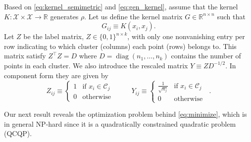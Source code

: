 \documentclass{article}
\DeclareMathOperator{\diag}{diag}
\newcommand\kk{K}
\newcommand\C{{\mathcal{C}}}
\newcommand\Zt{Y}
\begin{document}
Based on 
\eqref{eq:kernel_semimetric} and \eqref{eq:gen_kernel}, assume that 
the kernel $\kk: \mathcal{X} \times \mathcal{X} \to \mathbb{R}$ 
generates $\rho$. 
Let us define  the kernel matrix
$G \in \mathbb{R}^{n\times n}$ such that
\begin{equation}
\label{eq:kernel_matrix}
G_{ij} \equiv \kk(x_i, x_j).
\end{equation}
Let $Z$ be the label matrix, $Z \in \{ 0,1 \}^{n\times k}$, 
with only one nonvanishing entry per row indicating to which cluster (columns)
each point (rows) belongs to. This matrix satisfy
$Z^\top Z = D$ where $D = \diag( n_1,\dotsc, n_k )$  contains
the number of points in each cluster. We also introduce the rescaled
matrix  $Y \equiv Z D^{-1/2}$. In component form they are given by
\begin{equation}
\label{eq:label_matrix}
Z_{ij} \equiv \begin{cases}
1 & \mbox{if $x_i \in \C_j$ } \\
0 & \mbox{otherwise}
\end{cases} \qquad
\Zt_{ij} \equiv \begin{cases}
\tfrac{1}{\sqrt{n_j}} & \mbox{if $x_i \in \C_j$ } \\
0 & \mbox{otherwise}
\end{cases} .
\end{equation}

Our next result reveals the optimization problem behind \eqref{eq:minimize},
which is in general NP-hard since
it is a quadratically constrained quadratic problem (QCQP).
\end{document}
